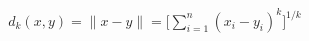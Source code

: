 \documentclass[preview]{standalone}
\begin{document}
\begin{align*}
d_{k}(x,y) = \lVert x-y \rVert = \Biggl\lbrack \sum_{i=1}^{n} (x_{i}-y_{i})^{k} \Biggr\rbrack ^{1/k}
\end{align*}
\end{document}
